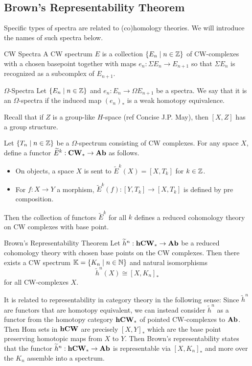 \documentclass[a4paper]{article}
\begin{document}
\subsection{Brown's Representability Theorem}
Specific types of spectra are related to (co)homology theories. We will introduce the names of such spectra below. 

\begin{defn}{CW Spectra}{} A CW spectrum $E$ is a collection $\{E_n\;|\;n\in\mathbb{Z}\}$ of CW-complexes with a chosen basepoint together with maps $e_n:\Sigma E_n\to E_{n+1}$ so that $\Sigma E_n$ is recognized as a subcomplex of $E_{n+1}$. 
\end{defn}

\begin{defn}{$\Omega$-Spectra}{} Let $\{E_n\;|\;n\in\mathbb{Z}\}$ and $e_n:E_n\to\Omega E_{n+1}$ be a spectra. We say that it is an $\Omega$-spectra if the induced map $(e_n)_\ast$ is a weak homotopy equivalence. 
\end{defn}

Recall that if $Z$ is a group-like $H$-space (ref Concise J.P. May), then $[X,Z]$ has a group structure. 

\begin{thm}{}{} Let $\{T_n\;|\;n\in\mathbb{Z}\}$ be a $\Omega$-spectrum consisting of CW complexes. For any space $X$, define a functor $\widetilde{E}^k:\bold{CW}_\ast\to\bold{Ab}$ as follows. 
\begin{itemize}
\item On objects, a space $X$ is sent to $\widetilde{E}^k(X)=[X,T_k]$ for $k\in\mathbb{Z}$.
\item For $f:X\to Y$ a morphism, $\widetilde{E}^k(f):[Y,T_k]\to[X,T_k]$ is defined by pre composition.
\end{itemize}
Then the collection of functors $\widetilde{E}^k$ for all $k$ defines a reduced cohomology theory on CW complexes with base point. 
\end{thm}

\begin{thm}{Brown's Representability Theorem}{} Let $\widetilde{h}^n:\bold{hCW}_\ast\to\bold{Ab}$ be a reduced cohomology theory with chosen base points on the CW complexes. Then there exists a CW spectrum $\mathbb{K}=\{K_n\;|\;n\in\mathbb{N}\}$ and natural isomorphisms $$\widetilde{h}^n(X)\cong[X,K_n]_\ast$$ for all CW-complexes $X$. 
\end{thm}

It is related to representability in category theory in the following sense: Since $\widetilde{h}^n$ are functors that are homotopy equivalent, we can instead consider $\widetilde{h}^n$ as a functor from the homotopy category $\bold{hCW}_\ast$ of pointed CW-complexes to $\bold{Ab}$. Then Hom sets in $\bold{hCW}$ are precisely $[X,Y]_\ast$ which are the base point preserving homotopic maps from $X$ to $Y$. Then Brown's representability states that the functor $\widetilde{h}^n:\bold{hCW}_\ast\to\bold{Ab}$ is representable via $[X,K_n]_\ast$ and more over the $K_n$ assemble into a spectrum. 
\end{document}

